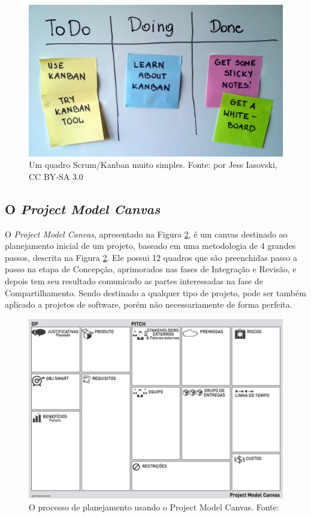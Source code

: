 \documentclass{article}
\newcommand{\othersize}{0.7\linewidth}
\begin{document}
\begin{figure}
    \centering
    \includegraphics[width=\othersize]{imagens/Simple-kanban-board-.jpg}
    \caption{Um quadro Scrum/Kanban muito simples. Fonte:  por Jess Iasovski, CC BY-SA 3.0 }
    \label{fig:kanban}
\end{figure}

\subsection{O \textit{Project Model Canvas}}

O \textit{Project Model Canvas}\citep{finocchio:2013}, apresentado na Figura \ref{fig:pmcp}, é um canvas destinado ao planejamento inicial de um projeto, baseado em uma metodologia de 4 grandes passos, descrita na Figura \ref{fig:pmcp}. Ele possui 12 quadros que são preenchidas passo a passo na etapa de Concepção,  aprimorados nas fases de Integração e Revisão, e depois tem seu resultado comunicado as partes interessadas na fase de Compartilhamento. Sendo destinado a qualquer tipo de projeto, pode ser também aplicado a projetos de software, porém não necessariamente de forma perfeita.

\begin{figure}
    \centering
    \includegraphics[width=\othersize]{imagens/ProjectMdoel Canvas.png}
    \caption{O processo de planejamento usando o Project Model Canvas. Fonte: \citet{finocchio:2013}}
    \label{fig:pmcp}
\end{figure}
\end{document}
